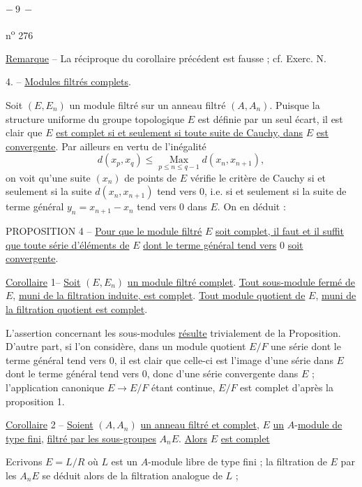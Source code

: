 
\begin{center}$-\ 9\ -$\end{center}\hfill n\textsuperscript{o} 276

\uline{Remarque} -- La réciproque du corollaire précédent est fausse ; cf. Exerc. N.

4. -- \uline{Modules filtrés complets}.

Soit $(E,E_n)$ un module filtré sur un anneau filtré $(A,A_n)$. Puisque la structure uniforme du groupe topologique $E$ est définie par un seul écart, il est clair que $E$ \uline{est complet si et seulement si toute suite de Cauchy, dans} $E$ \uline{est convergente}. Par ailleurs en vertu de l'inégalité
\[
d(x_p,x_q)\leqslant\underset{p\leqslant n\leqslant q-1}{\operatorname{Max}}d(x_n,x_{n+1}),
\]
on voit qu'une suite $(x_n)$ de points de $E$ vérifie le critère de Cauchy si et seulement si la suite $d(x_n,x_{n+1})$ tend vers $0$, i.e. si et seulement si la suite de terme général $y_n=x_{n+1}-x_n$ tend vers $0$ dans $E$. On en déduit :

PROPOSITION 4 -- \uline{Pour que le module filtré} $E$ \uline{soit complet, il faut et il suffit que toute série d'éléments de} $E$ \uline{dont le terme général tend vers} $0$ \uline{soit convergente}.

\uline{Corollaire} 1-- \uline{Soit} $(E,E_n)$ \uline{un module filtré complet}. \uline{Tout sous-module fermé de} $E$, \uline{muni de la filtration induite, est complet}. \uline{Tout module quotient de} $E$, \uline{muni de la filtration quotient est complet}.

L'assertion concernant les sous-modules \uline{résulte} trivialement de la Proposition. D'autre part, si l'on considère, dans un module quotient $E/F$ une série dont le terme général tend vers $0$, il est clair que celle-ci est l'image d'une série dans $E$ dont le terme général tend vers $0$, donc d'une série convergente dans $E$ ; l'application canonique $E\to E/F$ étant continue, $E/F$ est complet d'après la proposition 1.

\uline{Corollaire} 2 -- \uline{Soient} $(A,A_n)$ \uline{un anneau filtré et complet}, $E$ \uline{un} $A$-\uline{module de type fini}, \uline{filtré par les sous-groupes} $A_nE$. \uline{Alors} $E$ \uline{est complet}

Ecrivons $E=L/R$ où $L$ est un $A$-module libre de type fini ; la filtration de $E$ par les $A_nE$ se déduit alors de la filtration analogue de $L$ ;
